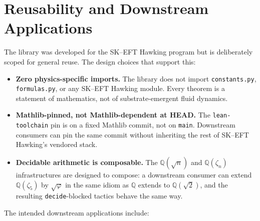 \documentclass[11pt]{article}
\begin{document}

\section{Reusability and Downstream Applications}
\label{sec:reusability}

The library was developed for the SK--EFT Hawking program but is
deliberately scoped for general reuse. The design choices that
support this:

\begin{itemize}
\item \textbf{Zero physics-specific imports.} The library does not
import \texttt{constants.py}, \texttt{formulas.py}, or any
SK--EFT Hawking module. Every theorem is a statement of mathematics,
not of substrate-emergent fluid dynamics.
\item \textbf{Mathlib-pinned, not Mathlib-dependent at HEAD.} The
\texttt{lean-toolchain} pin is on a fixed Mathlib commit, not on
\texttt{main}. Downstream consumers can pin the same commit
without inheriting the rest of SK--EFT Hawking's vendored stack.
\item \textbf{Decidable arithmetic is composable.} The
$\mathbb{Q}(\sqrt{n})$ and $\mathbb{Q}(\zeta_n)$ infrastructures
are designed to compose: a downstream consumer can extend
$\mathbb{Q}(\zeta_5)$ by $\sqrt{\varphi}$ in the same idiom as
$\mathbb{Q}$ extends to $\mathbb{Q}(\sqrt{2})$, and the resulting
\texttt{decide}-blocked tactics behave the same way.
\end{itemize}

The intended downstream applications include:
\end{document}
